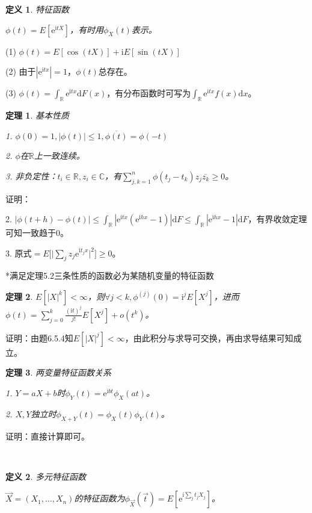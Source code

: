 \documentclass[a4paper,UTF8,fontset=windows]{ctexart}
\newtheorem{thm}{定理}[section]
\newtheorem{defi}{定义}[section]
\begin{document}
\begin{defi} 特征函数

$\phi(t)=E[\mathrm{e}^{\mathrm{i}tX}]$，有时用$\phi_X(t)$表示。
\end{defi}

(1) $\phi(t)=E[\cos(tX)]+\mathrm{i}E[\sin(tX)]$

(2) 由于$|\mathrm{e}^{\mathrm{i}tx}|=1$，$\phi(t)$总存在。

(3) $\phi(t)=\int_\mathbb{R}\mathrm{e}^{\mathrm{i}tx}\mathrm{d}F(x)$，有分布函数时可写为$\int_\mathbb{R}\mathrm{e}^{\mathrm{i}tx}f(x)\mathrm{d}x$。

\begin{thm} 基本性质

1. $\phi(0)=1,|\phi(t)|\le1,\overline{\phi(t)}=\phi(-t)$

2. $\phi$在$\mathbb{R}$上一致连续。

3. \emph{非负定}性：$t_i\in\mathbb{R},z_i\in\mathbb{C}$，有$\sum_{j,k=1}^n\phi(t_j-t_k)z_j\overline{z_k}\ge0$。

\end{thm}

证明：

2. $|\phi(t+h)-\phi(t)|\le\int_\mathbb{R}{|\mathrm{e}^{\mathrm{i}tx}(\mathrm{e}^{\mathrm{i}hx}-1)|\mathrm{d}F}\le\int_\mathbb{R}{|\mathrm{e}^{\mathrm{i}hx}-1|\mathrm{d}F}$，有界收敛定理可知一致趋于0。

3. 原式$=E\Big[\big|\sum_jz_j\mathrm{e}^{\mathrm{i}t_jx}\big|^2\Big]\ge0$。

*满足定理5.2三条性质的函数必为某随机变量的特征函数

\begin{thm}
$E[|X|^k]<\infty$，则$\forall j<k,\phi^{(j)}(0)=\mathrm{i}^jE[X^j]$，进而$\phi(t)=\sum_{j=0}^k\frac{(\mathrm{i}t)^j}{j!}E[X^j]+o(t^k)$。
\end{thm}

证明：由题6.5.4知$E[|X|^j]<\infty$，由此积分与求导可交换，再由求导结果可知成立。

\begin{thm} 两变量特征函数关系

1. $Y=aX+b$时$\phi_Y(t)=\mathrm{e}^{\mathrm{i}bt}\phi_X(at)$。

2. $X,Y$独立时$\phi_{X+Y}(t)=\phi_X(t)\phi_Y(t)$。
\end{thm}

证明：直接计算即可。

~

\begin{defi} 多元特征函数

$\vec{X}=(X_1,\dots,X_n)$的特征函数为$\phi_{\vec{X}}(\vec{t})=E[\mathrm{e}^{\mathrm{i}\sum_jt_jX_j}]$。
\end{defi}
\end{document}
